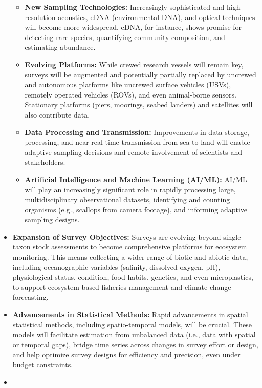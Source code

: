 \documentclass[
  letterpaper,
  oneside,
  open=any]{scrbook}
\providecommand{\tightlist}{%
  \setlength{\itemsep}{0pt}\setlength{\parskip}{0pt}}\usepackage{longtable,booktabs,array}
\begin{document}
\begin{itemize}
  \begin{itemize}
  \tightlist
  \item
    \textbf{New Sampling Technologies:} Increasingly sophisticated and
    high-resolution acoustics, eDNA (environmental DNA), and optical
    techniques will become more widespread. eDNA, for instance, shows
    promise for detecting rare species, quantifying community
    composition, and estimating abundance.
  \item
    \textbf{Evolving Platforms:} While crewed research vessels will
    remain key, surveys will be augmented and potentially partially
    replaced by uncrewed and autonomous platforms like uncrewed surface
    vehicles (USVs), remotely operated vehicles (ROVs), and even
    animal-borne sensors. Stationary platforms (piers, moorings, seabed
    landers) and satellites will also contribute data.
  \item
    \textbf{Data Processing and Transmission:} Improvements in data
    storage, processing, and near real-time transmission from sea to
    land will enable adaptive sampling decisions and remote involvement
    of scientists and stakeholders.
  \item
    \textbf{Artificial Intelligence and Machine Learning (AI/ML):} AI/ML
    will play an increasingly significant role in rapidly processing
    large, multidisciplinary observational datasets, identifying and
    counting organisms (e.g., scallops from camera footage), and
    informing adaptive sampling designs.
  \end{itemize}
\item
  \textbf{Expansion of Survey Objectives:} Surveys are evolving beyond
  single-taxon stock assessments to become comprehensive platforms for
  ecosystem monitoring. This means collecting a wider range of biotic
  and abiotic data, including oceanographic variables (salinity,
  dissolved oxygen, pH), physiological status, condition, food habits,
  genetics, and even microplastics, to support ecosystem-based fisheries
  management and climate change forecasting.
\item
  \textbf{Advancements in Statistical Methods:} Rapid advancements in
  spatial statistical methods, including spatio-temporal models, will be
  crucial. These models will facilitate estimation from unbalanced data
  (i.e., data with spatial or temporal gaps), bridge time series across
  changes in survey effort or design, and help optimize survey designs
  for efficiency and precision, even under budget constraints.
\item

\end{itemize}
\end{document}

